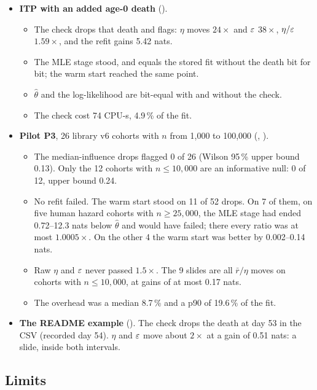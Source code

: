 \begin{itemize}[nosep]
  \item \textbf{ITP with an added age-0 death} ().
    \begin{itemize}[nosep]
      \item The check drops that death and flags: $\eta$ moves $24\times$ and $\varepsilon$ $38\times$, $\eta/\varepsilon$ $1.59\times$,
        and the refit gains 5.42 nats.
      \item The MLE stage stood, and equals the stored fit without the death bit for bit; the warm start reached the
        same point.
      \item $\hat\theta$ and the log-likelihood are bit-equal with and without the check.
      \item The check cost 74 CPU-s, 4.9\,\% of the fit.
    \end{itemize}
  \item \textbf{Pilot P3}, 26 library v6 cohorts with $n$ from 1,000 to 100,000 (,
    ).
    \begin{itemize}[nosep]
      \item The median-influence drops flagged 0 of 26 (Wilson 95\,\% upper bound 0.13). Only the 12 cohorts with
        $n\le10{,}000$ are an informative null: 0 of 12, upper bound 0.24.
      \item No refit failed. The warm start stood on 11 of 52 drops. On 7 of them, on five human hazard cohorts with
        $n\ge25{,}000$, the MLE stage had ended 0.72--12.3 nats below $\hat\theta$ and would have failed; there every
        ratio was at most $1.0005\times$. On the other 4 the warm start was better by 0.002--0.14 nats.
      \item Raw $\eta$ and $\varepsilon$ never passed $1.5\times$. The 9 slides are all $\bar r/\eta$ moves on cohorts with
        $n\le10{,}000$, at gains of at most 0.17 nats.
      \item The overhead was a median 8.7\,\% and a p90 of 19.6\,\% of the fit.
    \end{itemize}
  \item \textbf{The README example} (). The check drops the death at day 53 in the CSV
    (recorded day 54). $\eta$ and $\varepsilon$ move about $2\times$ at a gain of 0.51 nats: a slide, inside both intervals.
\end{itemize}

\subsection{Limits}\label{sec:lev-limits}

